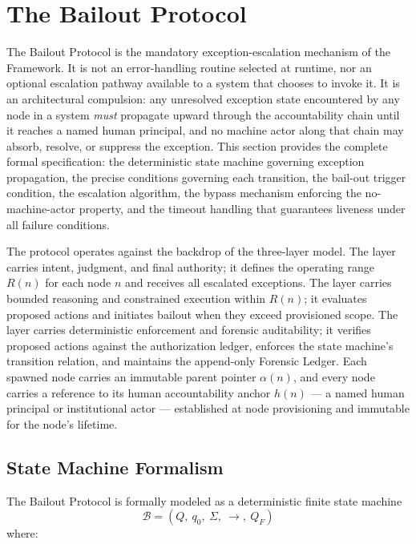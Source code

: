 \section{The Bailout Protocol}\label{sec:bailout}

The Bailout Protocol is the mandatory exception-escalation mechanism of the \bxthree{} Framework. It is not an error-handling routine selected at runtime, nor an optional escalation pathway available to a system that chooses to invoke it. It is an architectural compulsion: any unresolved exception state encountered by any node in a \bxthree{} system \emph{must} propagate upward through the accountability chain until it reaches a named human principal, and no machine actor along that chain may absorb, resolve, or suppress the exception. This section provides the complete formal specification: the deterministic state machine governing exception propagation, the precise conditions governing each transition, the bail-out trigger condition, the escalation algorithm, the bypass mechanism enforcing the no-machine-actor property, and the timeout handling that guarantees liveness under all failure conditions.

The protocol operates against the backdrop of the \bxthree{} three-layer model. The \purpose{} layer carries intent, judgment, and final authority; it defines the operating range $R(n)$ for each node $n$ and receives all escalated exceptions. The \bounds{} layer carries bounded reasoning and constrained execution within $R(n)$; it evaluates proposed actions and initiates bailout when they exceed provisioned scope. The \fact{} layer carries deterministic enforcement and forensic auditability; it verifies proposed actions against the authorization ledger, enforces the state machine's transition relation, and maintains the append-only Forensic Ledger. Each spawned node carries an immutable parent pointer $\alpha(n)$, and every node carries a reference to its human accountability anchor $h(n)$ — a named human principal or institutional actor — established at node provisioning and immutable for the node's lifetime.

\subsection{State Machine Formalism}\label{sec:state-machine}

The Bailout Protocol is formally modeled as a deterministic finite state machine
\[
\mathcal{B} = (Q,\ q_0,\ \Sigma,\ \rightarrow,\ Q_F)
\]
where:

